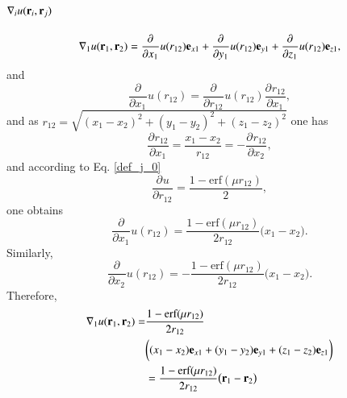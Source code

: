 \documentclass[aip,jcp,reprint,noshowkeys,superscriptaddress]{revtex4-1}
\newcommand{\deriv}[3]{\frac{\partial^{#3} #1}{\partial {#2}^{#3}}}
\newcommand{\br}[0]{{\bf {r}}}
\begin{document}
\subsection{$\nabla_i u(\br{}_i,\br{}_j)$}
\begin{equation}
 \nabla_1 u(\br{}_1,\br{}_2) = \deriv{}{x_1}{}u(r_{12}) {\bf e}_{x1} + \deriv{}{y_1}{}u(r_{12}) {\bf e}_{y1} + \deriv{}{z_1}{}u(r_{12}) {\bf e}_{z1},
\end{equation}
and 
\begin{equation}
 \deriv{}{x_1}{}u(r_{12}) = \deriv{}{r_{12}}{}u(r_{12}) \deriv{r_{12}}{x_1}{},
\end{equation}
and as $r_{12} = \sqrt{(x_1 - x_2)^2 + (y_1 - y_2)^2 + (z_1 - z_2)^2} $ one has
\begin{equation}
 \deriv{r_{12}}{x_1}{} = \frac{x_1 - x_2}{r_{12}} = -\deriv{r_{12}}{x_2}{},
\end{equation}
and according to Eq. \eqref{def_j_0}
\begin{equation}
 \deriv{u}{r_{12}}{} = \frac{1 - \text{erf}(\mu r_{12})}{2},
\end{equation}
one obtains 
\begin{equation}
 \label{eq:dx1_u}
 \deriv{}{x_1}{}u(r_{12}) = \frac{1 - \text{erf}(\mu r_{12})}{2 r_{12}} \bigg(x_1 - x_2 \bigg).
\end{equation}
Similarly, 
\begin{equation}
 \label{eq:dx2_u}
 \deriv{}{x_2}{}u(r_{12}) = -\frac{ 1 - \text{erf}(\mu r_{12})}{2 r_{12} } \bigg(x_1 - x_2 \bigg).
\end{equation}
Therefore, 
\begin{equation}
 \label{eq:nabla_u}
 \begin{aligned}
 \nabla_1 u(\br{}_1,\br{}_2) = &\frac{1 - \text{erf}(\mu r_{12})}{2 r_{12}} \\ 
 & \bigg( (x_1 - x_2) {\bf e}_{x1} + (y_1 - y_2) {\bf e}_{y1} + (z_1 - z_2) {\bf e}_{z1}\bigg) \\
 &=  \frac{1 - \text{erf}(\mu r_{12})}{2 r_{12}} \big( \br{}_1 - \br{}_2 \big)
 \end{aligned}
\end{equation}
\end{document}
